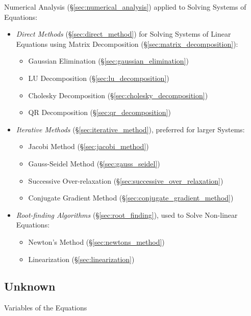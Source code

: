 Numerical Analysis (\S\ref{sec:numerical_analysis}) applied to Solving Systems
of Equations:
\begin{itemize}
  \item \emph{Direct Methods} (\S\ref{sec:direct_method}) for Solving Systems of
    Linear Equations using Matrix Decomposition
    (\S\ref{sec:matrix_decomposition}):
    \begin{itemize}
      \item Gaussian Elimination (\S\ref{sec:gaussian_elimination})
      \item LU Decomposition (\S\ref{sec:lu_decomposition})
      \item Cholesky Decomposition (\S\ref{sec:cholesky_decomposition})
      \item QR Decomposition (\S\ref{sec:qr_decomposition})
    \end{itemize}
  \item \emph{Iterative Methods} (\S\ref{sec:iterative_method}), preferred for
    larger Systems:
    \begin{itemize}
      \item Jacobi Method (\S\ref{sec:jacobi_method})
      \item Gauss-Seidel Method (\S\ref{sec:gauss_seidel})
      \item Successive Over-relaxation (\S\ref{sec:successive_over_relaxation})
      \item Conjugate Gradient Method (\S\ref{sec:conjugate_gradient_method})
    \end{itemize}
  \item \emph{Root-finding Algorithms} (\S\ref{sec:root_finding}), used to
    Solve Non-linear Equations:
    \begin{itemize}
      \item Newton's Method (\S\ref{sec:newtons_method})
      \item Linearization (\S\ref{sec:linearization})
    \end{itemize}
\end{itemize}



\subsection{Unknown}\label{sec:unknown}

Variables of the Equations



